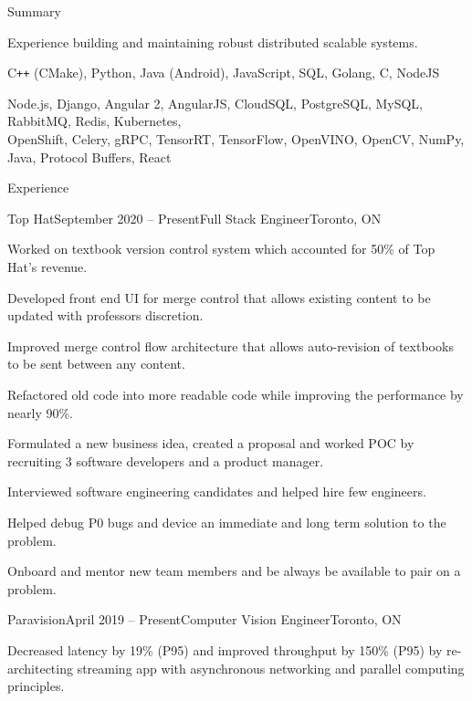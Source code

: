 \documentclass{resume}
\begin{document}
  \begin{rSection}{Summary}
    \begin{rSummary}
    {
      \item Experience building and maintaining robust distributed scalable systems.
      \item C\texttt{++} (CMake), Python, Java (Android), JavaScript, SQL, Golang, C, NodeJS
      \item Node.js, Django, Angular 2, AngularJS, CloudSQL, PostgreSQL, MySQL, RabbitMQ, Redis, Kubernetes,\\ OpenShift, Celery, gRPC, TensorRT, TensorFlow, OpenVINO, OpenCV, NumPy, Java, Protocol Buffers, React
    }
    \end{rSummary}
  \end{rSection}

  \begin{rSection}{Experience}
    \begin{rSubsection}{Top Hat}{September 2020 – Present}{Full Stack Engineer}{Toronto, ON}
      \item Worked on textbook version control system which accounted for 50\% of Top Hat's revenue.
      \item Developed front end UI for merge control that allows existing content to be updated with professors discretion. 
      \item Improved merge control flow architecture that allows auto-revision of textbooks to be sent between any content.
      \item Refactored old code into more readable code while improving the performance by nearly 90\%.
      \item Formulated a new business idea, created a proposal and worked POC by recruiting 3 software developers and a product manager.
      \item Interviewed software engineering candidates and helped hire few engineers.
      \item Helped debug P0 bugs and device an immediate and long term solution to the problem.
      \item Onboard and mentor new team members and be always be available to pair on a problem. 
    \end{rSubsection}
    \begin{rSubsection}{Paravision}{April 2019 – Present}{Computer Vision Engineer}{Toronto, ON}
    \item Decreased latency by 19\% (P95) and improved throughput by 150\% (P95) by re-architecting streaming app with asynchronous networking and parallel computing principles.

\end{rSubsection}
\end{rSection}
\end{document}
